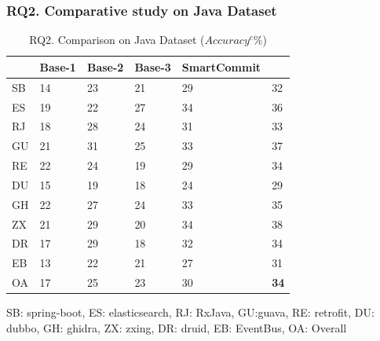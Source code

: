 \subsubsection{{\bf RQ2. Comparative study on Java Dataset}}


\begin{table}[t]
	\caption{RQ2. Comparison on Java Dataset ($Accuracy^c$\%)}
	\vspace{-12pt}
	\begin{center}
		\footnotesize
		\tabcolsep 4pt
		\renewcommand{\arraystretch}{1} \begin{tabular}{p{0.5cm}<{\centering}|p{1.2cm}<{\centering}|p{1.2cm}<{\centering}|p{1.2cm}<{\centering}|p{1.2cm}<{\centering}|p{1.2cm}<{\centering}}
			
			\hline
			          & Base-1 & Base-2  & Base-3 & SmartCommit & \bf {\tool}\\
			\hline
			SB   & 14 & 23 & 21 & 29 & 32\\
			ES   & 19 & 22 & 27 & 34 & 36\\
			RJ   & 18 & 28 & 24 & 31 & 33\\
			GU   & 21 & 31 & 25 & 33 & 37\\
			RE   & 22 & 24 & 19 & 29 & 34\\
			DU   & 15 & 19 & 18 & 24 & 29\\
			GH   & 22 & 27 & 24 & 33 & 35\\
			ZX   & 21 & 29 & 20 & 34 & 38\\
			DR   & 17 & 29 & 18 & 32 & 34\\
			EB   & 13 & 22 & 21 & 27 & 31\\
			\hline
			OA   &  17  & 25 &  23 & 30 & {\bf 34} \\
			\hline
		\end{tabular}
		\label{RQ2-result-1}
	SB: spring-boot, ES: elasticsearch, RJ: RxJava, GU:guava, RE: retrofit, DU: dubbo, GH: ghidra, ZX: zxing, DR: druid, EB: EventBus, OA: Overall
	\end{center}
\end{table}


